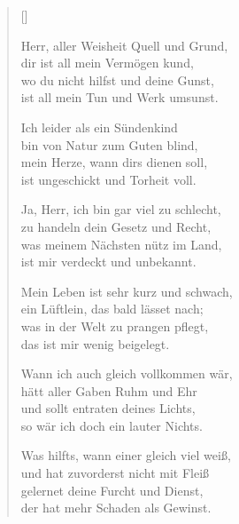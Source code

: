 \begin{multicols}{2}
\settowidth{\versewidth}{Ja, Herr, ich bin gar viel zu schlecht,}
\begin{verse}[\versewidth]

 Herr, aller Weisheit Quell und Grund,\\
dir ist all mein Vermögen kund,\\
wo du nicht hilfst und deine Gunst,\\
ist all mein Tun und Werk umsunst.

 Ich leider als ein Sündenkind\\
bin von Natur zum Guten blind,\\
mein Herze, wann dirs dienen soll,\\
ist ungeschickt und Torheit voll.

 Ja, Herr, ich bin gar viel zu schlecht,\\
zu handeln dein Gesetz und Recht,\\
was meinem Nächsten nütz im Land,\\
ist mir verdeckt und unbekannt.

 Mein Leben ist sehr kurz und schwach,\\
ein Lüftlein, das bald lässet nach;\\
was in der Welt zu prangen pflegt,\\
das ist mir wenig beigelegt.

 Wann ich auch gleich vollkommen wär,\\
hätt aller Gaben Ruhm und Ehr\\
und sollt entraten deines Lichts,\\
so wär ich doch ein lauter Nichts.

 Was hilfts, wann einer gleich viel weiß,\\
und hat zuvorderst nicht mit Fleiß\\
gelernet deine Furcht und Dienst,\\
der hat mehr Schaden als Gewinst.


\end{verse}
\end{multicols}
